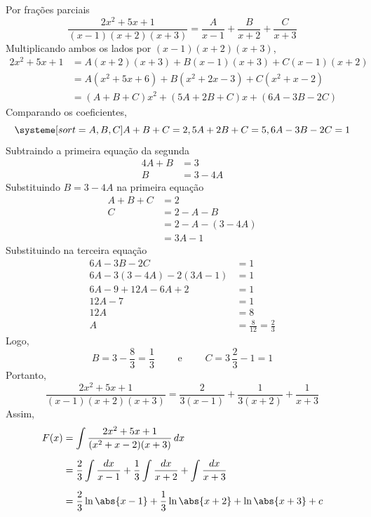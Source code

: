 \documentclass[a4paper,12pt,fleqn]{article}
\begin{document}
\begin{answer}
Por frações parciais
\[
  \frac{2x^2+5x+1}{(x-1)(x+2)(x+3)}
  =
  \frac{A}{x-1}
  +
  \frac{B}{x+2}
  +
  \frac{C}{x+3}
\]
Multiplicando ambos os lados por \((x-1)(x+2)(x+3)\),
\begin{align*}
  2x^2 + 5x + 1
  & = A(x+2)(x+3)
    + B(x-1)(x+3)
    + C(x-1)(x+2)  \\
  & = A(x^2+5x+6)
    + B(x^2+2x-3)
    + C(x^2+x-2)   \\
  & = (A+B+C)x^2
    + (5A+2B+C)x
    + (6A-3B-2C)
\end{align*}
Comparando os coeficientes,
\[
  \systeme[sort={A,B,C}]{
     A +  B +  C = 2,
    5A + 2B +  C = 5,
    6A - 3B - 2C = 1
  }
\]
Subtraindo a primeira equação da segunda
\begin{align*}
  4A + B & = 3   \\
  B      & =3-4A
\end{align*}
Substituindo \(B = 3 - 4A\) na primeira equação
\begin{align*}
  A +  B +  C & = 2          \\
  C           & = 2 - A - B  \\
              & = 2-A-(3-4A) \\
              & = 3A - 1
\end{align*}
Substituindo na terceira equação
\begin{align*}
  6A - 3B - 2C       & = 1          \\
  6A-3(3-4A)-2(3A-1) & = 1          \\
  6A-9+12A-6A+2      & = 1          \\
  12A-7              & = 1          \\
  12A                & = 8          \\
  A                  & = \frac{8}{12} = \frac{2}{3}
\end{align*}Logo,
\[
  B
  = 3 - \frac{8}{3}
  = \frac{1}{3}
\qquad\text{ e }\qquad
  C
  = 3\,\frac{2}{3} - 1
  = 1
\]
Portanto,
\[
  \frac{2x^2+5x+1}{(x-1)(x+2)(x+3)}
  = \frac{2}{3(x-1)}
  + \frac{1}{3(x+2)}
  + \frac{1}{x+3}
\]
Assim,
\begin{align*}
F(x)
& = \int \frac{2x^2+5x+1}{(x^2 + x -2)(x+3)}\,dx
\\[2mm]
& = \frac{2}{3}\int\frac{dx}{x-1}
  + \frac{1}{3}\int\frac{dx}{x+2}
  + \int\frac{dx}{x+3}
\\[2mm]
& = \frac{2}{3}\ln\abs{x-1}
  + \frac{1}{3}\ln\abs{x+2}
  + \ln\abs{x+3}
  + c
\end{align*}
\end{answer}
\end{document}
